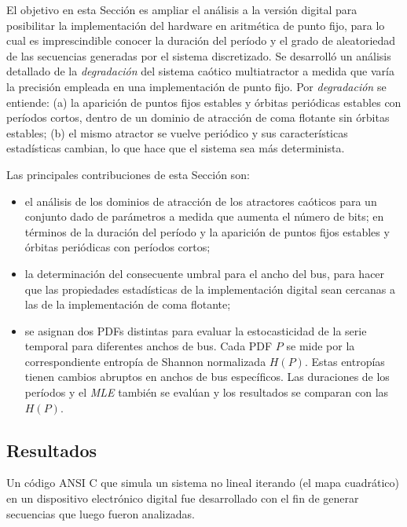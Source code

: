 El objetivo en esta Sección es ampliar el análisis a la versión digital para posibilitar la implementación del hardware en aritmética de punto fijo, para lo cual es imprescindible conocer la duración del período y el grado de aleatoriedad de las secuencias generadas por el sistema discretizado.
Se desarrolló un análisis detallado de la \textsl{degradación} del sistema caótico multiatractor a medida que varía la precisión empleada en una implementación de punto fijo.
Por \textsl{degradación} se entiende:
(a) la aparición de puntos fijos estables y órbitas periódicas estables con períodos cortos, dentro de un dominio de atracción de coma flotante sin órbitas estables;
(b) el mismo atractor se vuelve periódico y sus características estadísticas cambian, lo que hace que el sistema sea más determinista.

Las principales contribuciones de esta Sección son:
\begin{itemize}
	\item el análisis de los dominios de atracción de los atractores caóticos para un conjunto dado de parámetros a medida que aumenta el número de bits; en términos de la duración del período y la aparición de puntos fijos estables y órbitas periódicas con períodos cortos;
	\item la determinación del consecuente umbral para el ancho del bus, para hacer que las propiedades estadísticas de la implementación digital sean cercanas a las de la implementación de coma flotante;
	\item se asignan dos PDFs distintas para evaluar la estocasticidad de la serie temporal para diferentes anchos de bus.
	Cada PDF $P$ se mide por la correspondiente entropía de Shannon normalizada $H(P)$.
	Estas entropías tienen cambios abruptos en anchos de bus específicos.
	Las duraciones de los períodos y el \textsl{MLE} también se evalúan y los resultados se comparan con las $H(P)$.
\end{itemize}

\subsection{Resultados}

Un código ANSI C que simula un sistema no lineal iterando (el mapa cuadrático) en un dispositivo electrónico digital fue desarrollado con el fin de generar secuencias que luego fueron analizadas.

